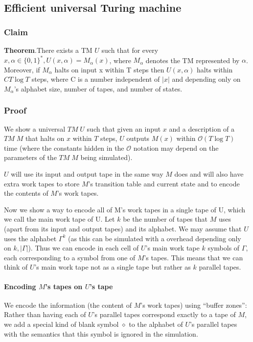 \documentclass[a4paper,12pt]{article}
\begin{document}
\subsection{Efficient universal Turing machine}
\subsubsection{Claim}
\textbf{Theorem}.There exists a TM $U$ such that for every $x, \alpha \in \{0, 1\}^{*} , U(x, \alpha) = M_\alpha(x)$, where $M_\alpha$
denotes the TM represented by $\alpha$.
Moreover, if $M_\alpha$ halts on input x within T steps then $U(x, \alpha)$ halts within $CT \log{T}$ steps,
where C is a number independent of $|x|$ and depending only on $M_\alpha$'s alphabet size,
number of tapes, and number of states.

\subsubsection{Proof}
We show a universal $TM \; U$
such that given an input $x$ and a description of a $TM \; M$ that halts on $x$ within $T$ steps,
$U$ outputs $M(x)$ within $\mathcal{O}(T\log T)$ time (where the constants hidden in the $\mathcal{O}$ notation
may depend on the parameters of the $TM \; M$ being simulated).

$U$ will use its input and output
tape in the same way $M$ does and will also have extra work tapes to store $M$’s transition
table and current state and to encode the contents of $M$’s work tapes.

Now we show a way to encode all of M’s work tapes in a single tape of U, which
we call the main work tape of U. 
Let $k$ be the number of tapes that $M$ uses (apart from its input and output tapes)
and  its alphabet. We may assume that $U$ uses the
alphabet $\Gamma^{k}$ (as this can be simulated with a overhead depending only on $k, |\Gamma|$). Thus
we can encode in each cell of $U$’s main work tape $k$ symbols of $\Gamma$, each corresponding
to a symbol from one of $M$'s tapes. This means that we can think of $U$’s main work tape
not as a single tape but rather as $k$ parallel tapes. 

\paragraph{Encoding \texorpdfstring{$M$}{}’s tapes on \texorpdfstring{$U$}{}’s tape}

	We encode the information (the content of $M$'s work tapes) using “buffer zones”: Rather
than having each of $U$’s parallel tapes correspond exactly to a tape of $M$, we add a
special kind of blank symbol $\diamond$ to the alphabet of $U$’s parallel tapes with the semantics
that this symbol is ignored in the simulation.
\end{document}
